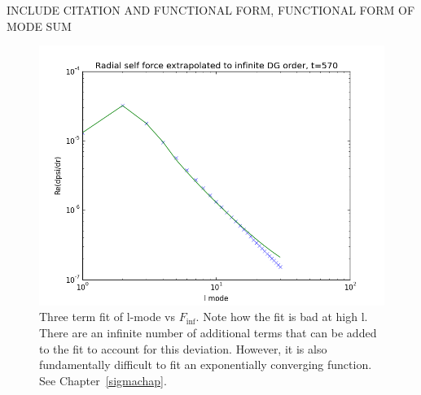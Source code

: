 INCLUDE CITATION AND FUNCTIONAL FORM, FUNCTIONAL FORM OF MODE SUM

\begin{figure}
  \includegraphics{finffit570}
  \caption{Three term fit of l-mode vs $F_{\inf}$. Note how the fit is bad at high l. There are an infinite number of additional terms that can be added to the fit to account for this deviation. However, it is also fundamentally difficult to fit an exponentially converging function. See Chapter~\ref{sigmachap}.}
\end{figure}

